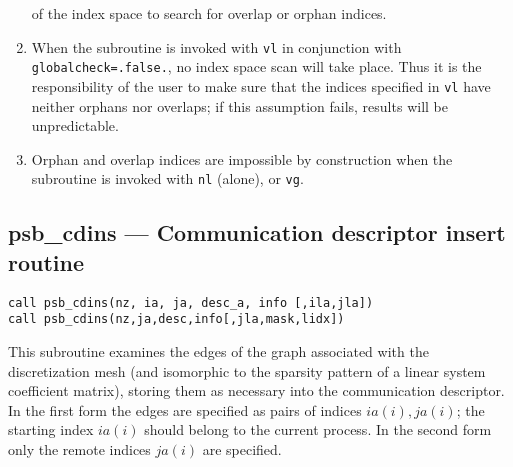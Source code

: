 \begin{enumerate}
  of the index   space to search for overlap or orphan indices.
\item When the subroutine is invoked with \verb|vl| in
  conjunction with \verb|globalcheck=.false.|, no index space scan
  will take place. Thus it is the responsibility of the user to make
  sure that the indices specified in \verb|vl| have neither orphans nor
  overlaps; if this assumption fails, results will be 
  unpredictable. 
\item Orphan and overlap indices are
  impossible by construction when the subroutine is invoked with
  \verb|nl| (alone),  or \verb|vg|.
\end{enumerate}


%
%
\clearpage\subsection*{psb\_cdins --- Communication descriptor insert
  routine}

\begin{verbatim}
call psb_cdins(nz, ia, ja, desc_a, info [,ila,jla])
call psb_cdins(nz,ja,desc,info[,jla,mask,lidx])
\end{verbatim}

This subroutine examines the edges of the graph associated with the
discretization mesh (and isomorphic to the sparsity pattern of a
linear system coefficient matrix), storing them as necessary into the
communication descriptor. In the first form the edges are specified as
pairs of indices $ia(i),ja(i)$; the starting index $ia(i)$ should
belong to the current process. 
In the second form only the remote indices $ja(i)$ are specified. 

